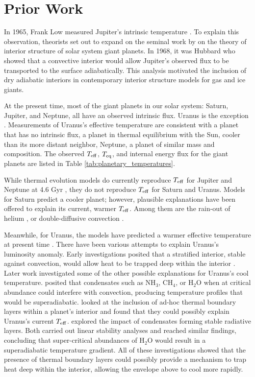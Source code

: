 \documentclass[11pt]{ucscthesisbs}
\begin{document}
\section{Prior Work}
In 1965, Frank Low measured Jupiter's intrinsic temperature \citep{low_1966}. To explain this observation, theorists \citep{hubbard_1968, smoluchowski_1967,hubbard_1977, hubbard_1977_2, podolak_1991} set out to expand on the seminal work by \citep{demarcus_1958} on the theory of interior structure of solar system giant planets. In 1968, it was Hubbard who showed that a convective interior would allow Jupiter's observed flux to be transported to the surface adiabatically. This analysis motivated the inclusion of dry adiabatic interiors in contemporary interior structure models for gas and ice giants.

At the present time, most of the giant planets in our solar system: Saturn, Jupiter, and Neptune, all have an observed intrinsic flux. Uranus is the exception \citep{pearl_conrath_1991}. Measurements of Uranus's effective temperature are consistent with a planet that has no intrinsic flux, a planet in thermal equilibrium with the Sun, cooler than its more distant neighbor, Neptune, a planet of similar mass and composition. The observed $T_{\rm eff}$, $T_{\rm eq}$, and internal energy flux for the giant planets are listed in Table \ref{tab:planetary_temperatures}. 

While thermal evolution models do currently reproduce $T_{\rm eff}$ for Jupiter and Neptune at 4.6 Gyr \citep{graboske_1975,fortney_2011}, they do not reproduce $T_{\rm eff}$ for Saturn and Uranus. Models for Saturn predict a cooler planet; however, plausible explanations have been offered to explain its current, warmer $T_{\rm eff}$. Among them are the rain-out of helium \citep{fortney_hubbard_2003, 2020ApJ...889...51M}, or double-diffusive convection \citep{leconte_chabrier_2013}. 

Meanwhile, for Uranus, the models have predicted a warmer effective temperature at present time \citep{fortney_2011, podolak_1991, hubbard_1995, 2019A&A...632A..70S}. There have been various attempts to explain Uranus's luminosity anomaly. Early investigations posited that a stratified interior, stable against convection, would allow heat to be trapped deep within the interior \citep{podolak_1991}. Later work investigated some of the other possible explanations for Uranus's cool temperature. \citep{guillot_1995} posited that condensates such as NH$_{3}$, CH$_{4}$, or H$_{2}$O when at critical abundance could interfere with convection, producing temperature profiles that would be superadiabatic. \citep{nettelmann_2016} looked at the inclusion of ad-hoc thermal boundary layers within a planet's interior and found that they could possibly explain Uranus's current $T_{\rm eff}$. \citep{friedson_2017,leconte_2017} explored the impact of condensates forming stable radiative layers. Both carried out linear stability analyses and reached similar findings, concluding that super-critical abundances of H$_{2}$O would result in a superadiabatic temperature gradient. All of these investigations showed that the presence of thermal boundary layers could possibly provide a mechanism to trap heat deep within the interior, allowing the envelope above to cool more rapidly.
\end{document}
